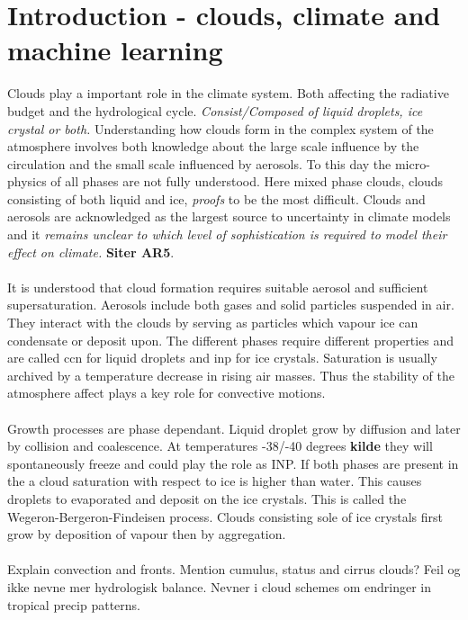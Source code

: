 \chapter{Introduction - clouds, climate and machine learning} \label{ch:introduction}

Clouds play a important role in the climate system. Both affecting the radiative budget and the hydrological cycle. \textit{Consist/Composed of liquid droplets, ice crystal or both.} Understanding how clouds form in the complex system of the atmosphere involves both knowledge about the large scale influence by the circulation and the small scale influenced by aerosols. To this day the micro-physics of all phases are not fully understood. Here mixed phase clouds, clouds consisting of both liquid and ice, \textit{proofs} to be the most difficult. Clouds and aerosols are acknowledged as the largest source to uncertainty in climate models and it \textit{remains unclear to which level of sophistication is required to model their effect on climate.} \textbf{Siter AR5}.
\\ \\
It is understood that cloud formation requires suitable aerosol and sufficient supersaturation. Aerosols include both gases and solid particles suspended in air.
They interact with the clouds by serving as particles which vapour ice can condensate or deposit upon. The different phases require different properties and are called \acrshort{ccn} for liquid droplets and \acrshort{inp} for ice crystals. Saturation is usually archived by a temperature decrease in rising air masses. Thus the stability of the atmosphere affect plays a key role for convective motions. 
\\ \\ 
Growth processes are phase dependant. Liquid droplet grow by diffusion and later by collision and coalescence. At temperatures -38/-40 degrees \textbf{kilde} they will spontaneously freeze and could play the role as INP. If both phases are present in the a cloud saturation with respect to ice is higher than water. This causes droplets to evaporated and deposit on the ice crystals. This is called the Wegeron-Bergeron-Findeisen process. Clouds consisting sole of ice crystals first grow by deposition of vapour then by aggregation. 
\\ \\ 
Explain convection and fronts. Mention cumulus, status and cirrus clouds?
Feil og ikke nevne mer hydrologisk balance. Nevner i cloud schemes om endringer in tropical precip patterns. 

